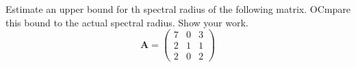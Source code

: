 Estimate an upper bound for th spectral radius of the following matrix. OCmpare this bound to the actual spectral radius. Show your work.
\begin{equation*}
	\boldsymbol{A}=
		\begin{pmatrix}
			7&0&3\\2&1&1\\2&0&2
		\end{pmatrix}
\end{equation*}
